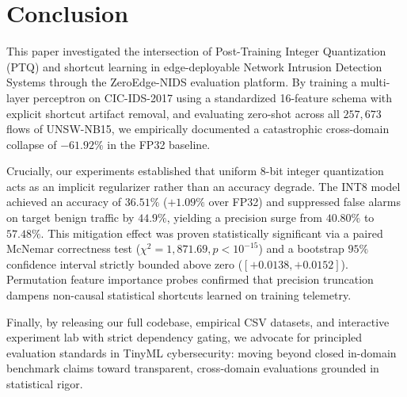\section{Conclusion}
\label{sec:conclusion}

This paper investigated the intersection of Post-Training Integer Quantization (PTQ) and shortcut learning in edge-deployable Network Intrusion Detection Systems through the ZeroEdge-NIDS evaluation platform. By training a multi-layer perceptron on CIC-IDS-2017 using a standardized 16-feature schema with explicit shortcut artifact removal, and evaluating zero-shot across all $257,673$ flows of UNSW-NB15, we empirically documented a catastrophic cross-domain collapse of $-61.92\%$ in the FP32 baseline.

Crucially, our experiments established that uniform 8-bit integer quantization acts as an implicit regularizer rather than an accuracy degrade. The INT8 model achieved an accuracy of $36.51\%$ ($+1.09\%$ over FP32) and suppressed false alarms on target benign traffic by $44.9\%$, yielding a precision surge from $40.80\%$ to $57.48\%$. This mitigation effect was proven statistically significant via a paired McNemar correctness test ($\chi^2 = 1,871.69, p < 10^{-15}$) and a bootstrap $95\%$ confidence interval strictly bounded above zero ($[+0.0138, +0.0152]$). Permutation feature importance probes confirmed that precision truncation dampens non-causal statistical shortcuts learned on training telemetry.

Finally, by releasing our full codebase, empirical CSV datasets, and interactive experiment lab with strict dependency gating, we advocate for principled evaluation standards in TinyML cybersecurity: moving beyond closed in-domain benchmark claims toward transparent, cross-domain evaluations grounded in statistical rigor.
